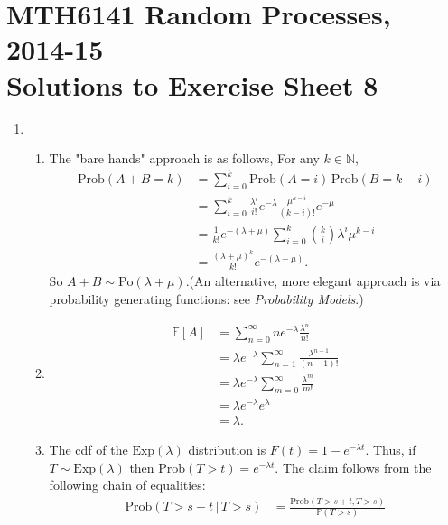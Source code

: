 \documentclass[11pt,a4paper]{article}
\begin{document}
    \section*{MTH6141 Random Processes, 2014-15\\Solutions to Exercise Sheet 8}
    \begin{enumerate}
        \item 
        \begin{enumerate}
            \item The "bare hands" approach is as follows, For any $k\in \mathbb{N}$,
            \begin{align*}
                \text{Prob}(A+B=k)
                &= \sum_{i=0}^k \text{Prob}(A=i)\, \text{Prob}(B=k-i)\\
                &= \sum_{i=0}^k \frac{\lambda^i}{i!}e^{-\lambda}\frac{\mu^{k-i}}{(k-i)!}e^{-\mu}\\
                &= \frac{1}{k!}e^{-(\lambda+\mu)}\sum_{i=0}^k \binom{k}{i}\lambda^i\mu^{k-i}\\
                &= \frac{(\lambda+\mu)^k}{k!}e^{-(\lambda + \mu)}.
            \end{align*}
            So $A+B\sim \text{Po}(\lambda + \mu)$.(An alternative, more elegant approach is via probability generating functions: see \textit{Probability Models}.)
            \item 
            \begin{align*}
                \mathbb{E}[A]
                &= \sum_{n=0}^\infty ne^{-\lambda}\frac{\lambda^n}{n!}\\
                &= \lambda e^{-\lambda}\sum_{n=1}^\infty \frac{\lambda^{n-1}}{(n-1)!}\\
                &= \lambda e^{-\lambda}\sum_{m=0}^\infty \frac{\lambda^m}{m!}\\
                &= \lambda e^{-\lambda}e^\lambda\\
                &= \lambda.
            \end{align*}
            \item The cdf of the $\text{Exp}(\lambda)$ distribution is $F(t) = 1 - e^{-\lambda t}$. Thus, if $T \sim \text{Exp}(\lambda)$ then $\text{Prob}(T>t) = e^{-\lambda t}$. The claim follows from the following chain of equalities:
            \begin{align*}
                \text{Prob}(T > s+t\,|\, T>s)
                &= \frac{\text{Prob}(T>s+t, T>s)}{\mathbb{P}(T>s)}\\

\end{align*}
\end{enumerate}
\end{enumerate}
\end{document}

